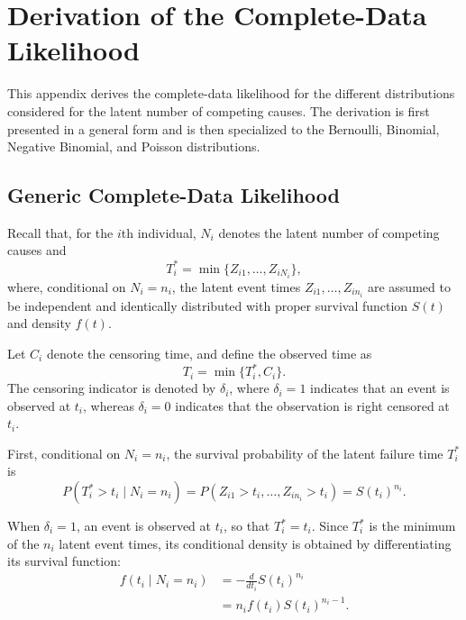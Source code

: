 \section{Derivation of the Complete-Data Likelihood}
\label{app:complete_data_likelihood}

This appendix derives the complete-data likelihood for the different
distributions considered for the latent number of competing causes. The
derivation is first presented in a general form and is then specialized to
the Bernoulli, Binomial, Negative Binomial, and Poisson distributions.

\subsection{Generic Complete-Data Likelihood}

Recall that, for the $i$th individual, $N_i$ denotes the latent number of
competing causes and
\begin{equation}
T_i^*=\min\{Z_{i1},\ldots,Z_{iN_i}\},
\end{equation}
where, conditional on $N_i=n_i$, the latent event times
$Z_{i1},\ldots,Z_{in_i}$ are assumed to be independent and identically
distributed with proper survival function $S(t)$ and density $f(t)$.

Let $C_i$ denote the censoring time, and define the observed time as
\begin{equation}
T_i=\min\{T_i^*,C_i\}.
\end{equation}
The censoring indicator is denoted by $\delta_i$, where
$\delta_i=1$ indicates that an event is observed at $t_i$, whereas
$\delta_i=0$ indicates that the observation is right censored at $t_i$.

First, conditional on $N_i=n_i$, the survival probability of the latent
failure time $T_i^*$ is
\begin{equation}
P(T_i^*>t_i\mid N_i=n_i)
=
P(Z_{i1}>t_i,\ldots,Z_{in_i}>t_i)
=
S(t_i)^{n_i}.
\label{eq:conditional_survival_N}
\end{equation}

When $\delta_i=1$, an event is observed at $t_i$, so that
$T_i^*=t_i$. Since $T_i^*$ is the minimum of the $n_i$ latent event times,
its conditional density is obtained by differentiating its survival
function:
\begin{align}
f(t_i\mid N_i=n_i)
&=
-\frac{d}{dt_i}S(t_i)^{n_i} \nonumber\\
&=
n_i f(t_i)S(t_i)^{n_i-1}.
\label{eq:conditional_density_N}
\end{align}

